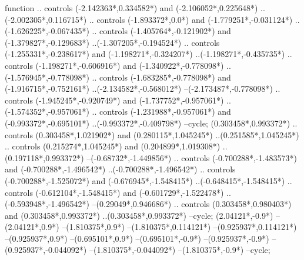 {\begin{scope}[x=1mm,y=1mm,line width=\SCstroke mm,line cap=round,line join=round]
\begin{SCpart}{function}
.. controls ({-2.142363*\SCF},{0.334582*\SCF}) and ({-2.106052*\SCF},{0.225648*\SCF}) ..({-2.002305*\SCF},{0.116715*\SCF})
.. controls ({-1.893372*\SCF},{0.0*\SCF}) and ({-1.779251*\SCF},{-0.031124*\SCF}) ..({-1.626225*\SCF},{-0.067435*\SCF})
.. controls ({-1.405764*\SCF},{-0.121902*\SCF}) and ({-1.379827*\SCF},{-0.129683*\SCF}) ..({-1.307205*\SCF},{-0.194524*\SCF})
.. controls ({-1.255331*\SCF},{-0.238617*\SCF}) and ({-1.198271*\SCF},{-0.324207*\SCF}) ..({-1.198271*\SCF},{-0.435735*\SCF})
.. controls ({-1.198271*\SCF},{-0.606916*\SCF}) and ({-1.340922*\SCF},{-0.778098*\SCF}) ..({-1.576945*\SCF},{-0.778098*\SCF})
.. controls ({-1.683285*\SCF},{-0.778098*\SCF}) and ({-1.916715*\SCF},{-0.752161*\SCF}) ..({-2.134582*\SCF},{-0.568012*\SCF})
--({-2.173487*\SCF},{-0.778098*\SCF})
.. controls ({-1.945245*\SCF},{-0.920749*\SCF}) and ({-1.737752*\SCF},{-0.957061*\SCF}) ..({-1.574352*\SCF},{-0.957061*\SCF})
.. controls ({-1.231988*\SCF},{-0.957061*\SCF}) and ({-0.993372*\SCF},{-0.695101*\SCF}) ..({-0.993372*\SCF},{-0.409798*\SCF})
--cycle;
 ({0.303458*\SCF},{0.993372*\SCF})
.. controls ({0.303458*\SCF},{1.021902*\SCF}) and ({0.280115*\SCF},{1.045245*\SCF}) ..({0.251585*\SCF},{1.045245*\SCF})
.. controls ({0.215274*\SCF},{1.045245*\SCF}) and ({0.204899*\SCF},{1.019308*\SCF}) ..({0.197118*\SCF},{0.993372*\SCF})
--({-0.68732*\SCF},{-1.449856*\SCF})
.. controls ({-0.700288*\SCF},{-1.483573*\SCF}) and ({-0.700288*\SCF},{-1.496542*\SCF}) ..({-0.700288*\SCF},{-1.496542*\SCF})
.. controls ({-0.700288*\SCF},{-1.525072*\SCF}) and ({-0.676945*\SCF},{-1.548415*\SCF}) ..({-0.648415*\SCF},{-1.548415*\SCF})
.. controls ({-0.612104*\SCF},{-1.548415*\SCF}) and ({-0.601729*\SCF},{-1.522478*\SCF}) ..({-0.593948*\SCF},{-1.496542*\SCF})
--({0.29049*\SCF},{0.946686*\SCF})
.. controls ({0.303458*\SCF},{0.980403*\SCF}) and ({0.303458*\SCF},{0.993372*\SCF}) ..({0.303458*\SCF},{0.993372*\SCF})
--cycle;
 ({2.04121*\SCF},{-0.9*\SCF})
--({2.04121*\SCF},{0.9*\SCF})
--({1.810375*\SCF},{0.9*\SCF})
--({1.810375*\SCF},{0.114121*\SCF})
--({0.925937*\SCF},{0.114121*\SCF})
--({0.925937*\SCF},{0.9*\SCF})
--({0.695101*\SCF},{0.9*\SCF})
--({0.695101*\SCF},{-0.9*\SCF})
--({0.925937*\SCF},{-0.9*\SCF})
--({0.925937*\SCF},{-0.044092*\SCF})
--({1.810375*\SCF},{-0.044092*\SCF})
--({1.810375*\SCF},{-0.9*\SCF})
--cycle;
\end{SCpart}
\end{scope}
}
